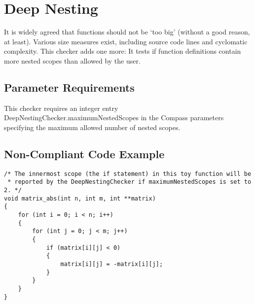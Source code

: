 %
%

\section{Deep Nesting}
\label{DeepNesting::overview}

It is widely agreed that functions should not be `too big' (without a good
reason, at least). Various size measures exist, including source code lines
and cyclomatic complexity. This checker adds one more: It tests if function
definitions contain more nested scopes than allowed by the user.

\subsection{Parameter Requirements}

This checker requires an integer entry DeepNestingChecker.maximumNestedScopes
in the Compass parameters specifying the maximum allowed number of nested
scopes.

\subsection{Non-Compliant Code Example}

\begin{verbatim}
/* The innermost scope (the if statement) in this toy function will be
 * reported by the DeepNestingChecker if maximumNestedScopes is set to 2. */
void matrix_abs(int n, int m, int **matrix)
{
    for (int i = 0; i < n; i++)
    {
        for (int j = 0; j < m; j++)
        {
            if (matrix[i][j] < 0)
            {
                matrix[i][j] = -matrix[i][j];
            }
        }
    }
}
\end{verbatim}

